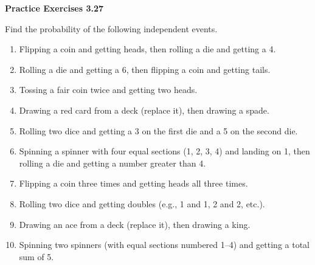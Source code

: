 \vspace{0.3ex}
\noindent\textbf{Practice Exercises 3.27}

\vspace{0.2ex}

Find the probability of the following independent events.

\begin{enumerate}[label=\color{blue}\arabic*.]
    \item Flipping a coin and getting heads, then rolling a die and getting a 4.
    \item Rolling a die and getting a 6, then flipping a coin and getting tails.
    \item Tossing a fair coin twice and getting two heads.
    \item Drawing a red card from a deck (replace it), then drawing a spade.
    \item Rolling two dice and getting a 3 on the first die and a 5 on the second die.
    \item Spinning a spinner with four equal sections (1, 2, 3, 4) and landing on 1, then rolling a die and getting a number greater than 4.
    \item Flipping a coin three times and getting heads all three times.
    \item Rolling two dice and getting doubles (e.g., 1 and 1, 2 and 2, etc.).
    \item Drawing an ace from a deck (replace it), then drawing a king.
    \item Spinning two spinners (with equal sections numbered 1–4) and getting a total sum of 5.
\end{enumerate}
